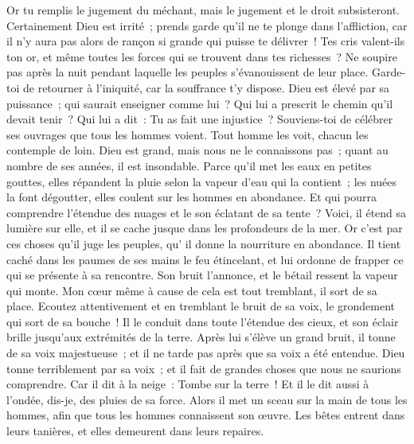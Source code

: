 \begin{multicols}{2}
Or tu remplis le jugement du méchant, mais le jugement et le droit subsisteront.
Certainement Dieu est irrité~; prends garde qu'il ne te plonge dans l'affliction, car il n'y aura pas alors de rançon si grande qui puisse te délivrer~!
Tes cris valent-ils ton or, et même toutes les forces qui se trouvent dans tes richesses~?
Ne soupire pas après la nuit pendant laquelle les peuples s'évanouissent de leur place.
Garde-toi de retourner à l'iniquité, car la souffrance t'y dispose.
Dieu est élevé par sa puissance~; qui saurait enseigner comme lui~?
Qui lui a prescrit le chemin qu'il devait tenir~? Qui lui a dit~: Tu as fait une injustice~?
Souviens-toi de célébrer ses ouvrages que tous les hommes voient.
Tout homme les voit, chacun les contemple de loin.
Dieu est grand, mais nous ne le connaissons pas~; quant au nombre de ses années, il est insondable.
Parce qu'il met les eaux en petites gouttes, elles répandent la pluie selon la vapeur d'eau qui la contient~;
les nuées la font dégoutter, elles coulent sur les hommes en abondance.
Et qui pourra comprendre l'étendue des nuages et le son éclatant de sa tente~?
Voici, il étend sa lumière sur elle, et il se cache jusque dans les profondeurs de la mer.
 Or c'est par ces choses qu'il juge les peuples, qu' il donne la nourriture en abondance.
 Il tient caché dans les paumes de ses mains le feu étincelant, et lui ordonne de frapper ce qui se présente à sa rencontre.
 Son bruit l'annonce, et le bétail ressent la vapeur qui monte.
\VerseOne{}Mon cœur même à cause de cela est tout tremblant, il sort de sa place.
Ecoutez attentivement et en tremblant le bruit de sa voix, le grondement qui sort de sa bouche~!
Il le conduit dans toute l'étendue des cieux, et son éclair brille jusqu'aux extrémités de la terre.
Après lui s'élève un grand bruit, il tonne de sa voix majestueuse~; et il ne tarde pas après que sa voix a été entendue.
Dieu tonne terriblement par sa voix~; et il fait de grandes choses que nous ne saurions comprendre.
Car il dit à la neige~: Tombe sur la terre~! Et il le dit aussi à l'ondée, dis-je, des pluies de sa force.
Alors il met un sceau sur la main de tous les hommes, afin que tous les hommes connaissent son œuvre.
Les bêtes entrent dans leurs tanières, et elles demeurent dans leurs repaires.

\end{multicols}
